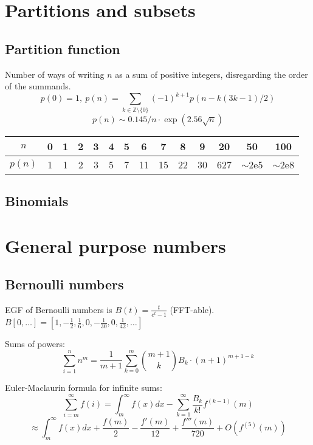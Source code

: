 \section{Partitions and subsets}
	\subsection{Partition function}
		Number of ways of writing $n$ as a sum of positive integers, disregarding the order of the summands.
		\[ p(0) = 1,\ p(n) = \sum_{k \in \mathbb Z \setminus \{0\}}{(-1)^{k+1} p(n - k(3k-1) / 2)} \]
		\[ p(n) \sim 0.145 / n \cdot \exp(2.56 \sqrt{n}) \]

		\begin{center}
		\begin{tabular}{c|c@{\ }c@{\ }c@{\ }c@{\ }c@{\ }c@{\ }c@{\ }c@{\ }c@{\ }c@{\ }c@{\ }c@{\ }c}
			$n$    & 0 & 1 & 2 & 3 & 4 & 5 & 6  & 7  & 8  & 9  & 20  & 50  & 100 \\ \hline
			$p(n)$ & 1 & 1 & 2 & 3 & 5 & 7 & 11 & 15 & 22 & 30 & 627 & $\mathtt{\sim}$2e5 & $\mathtt{\sim}$2e8 \\
		\end{tabular}
		\end{center}

	\subsection{Binomials}

\section{General purpose numbers}
	\subsection{Bernoulli numbers}
		EGF of Bernoulli numbers is $B(t)=\frac{t}{e^t-1}$ (FFT-able).
		$B[0,\ldots] = [1, -\frac{1}{2}, \frac{1}{6}, 0, -\frac{1}{30}, 0, \frac{1}{42}, \ldots]$

		Sums of powers:
		\small
		\[ \sum_{i=1}^n n^m = \frac{1}{m+1} \sum_{k=0}^m \binom{m+1}{k} B_k \cdot (n+1)^{m+1-k} \]
		\normalsize

		Euler-Maclaurin formula for infinite sums:
		\small
		\[ \sum_{i=m}^{\infty} f(i) = \int_m^\infty f(x) dx - \sum_{k=1}^\infty \frac{B_k}{k!}f^{(k-1)}(m) \]
		\[ \approx \int_{m}^\infty f(x)dx + \frac{f(m)}{2} - \frac{f'(m)}{12} + \frac{f'''(m)}{720} + O(f^{(5)}(m)) \]
		\normalsize

